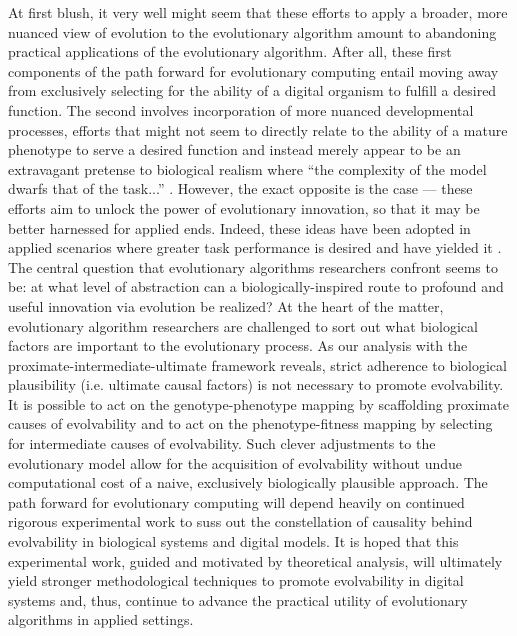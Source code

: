 At first blush, it very well might seem that these efforts to apply a broader, more nuanced view of evolution to the evolutionary algorithm amount to abandoning practical applications of the evolutionary algorithm.
After all, these first components of the path forward for evolutionary computing entail moving away from exclusively selecting for the ability of a digital organism to fulfill a desired function.
The second involves incorporation of more nuanced developmental processes, efforts that might not seem to directly relate to the ability of a mature phenotype to serve a desired function and instead merely appear to be an extravagant pretense to biological realism where ``the complexity of the model dwarfs that of the task...'' \cite[p 354]{Downing2015IntelligenceSystems}.
However, the exact opposite is the case --- these efforts aim to unlock the power of evolutionary innovation, so that it may be better harnessed for applied ends.
Indeed, these ideas have been adopted in applied scenarios where greater task performance is desired and have yielded it \cite{Cheney2013UnshacklingEncoding, Mengistu2016EvolvabilityIt, Reisinger2007AcquiringRepresentations, Lehman2008ExploitingNovelty}.
The central question that evolutionary algorithms researchers confront seems to be: at what level of abstraction can a biologically-inspired route to profound and useful innovation via evolution be realized?
At the heart of the matter, evolutionary algorithm researchers are challenged to sort out what biological factors are important to the evolutionary process.
As our analysis with the proximate-intermediate-ultimate framework reveals, strict adherence to biological plausibility (i.e. ultimate causal factors) is not necessary to promote evolvability.
It is possible to act on the genotype-phenotype mapping by scaffolding proximate causes of evolvability and to act on the phenotype-fitness mapping by selecting for intermediate causes of evolvability.
Such clever adjustments to the evolutionary model allow for the acquisition of evolvability without undue computational cost of a naive, exclusively biologically plausible approach.
The path forward for evolutionary computing will depend heavily on continued rigorous experimental work to suss out the constellation of causality behind evolvability in biological systems and digital models.
It is hoped that this experimental work, guided and motivated by theoretical analysis, will ultimately yield stronger methodological techniques to promote evolvability in digital systems and, thus, continue to advance the practical utility of evolutionary algorithms in applied settings.
